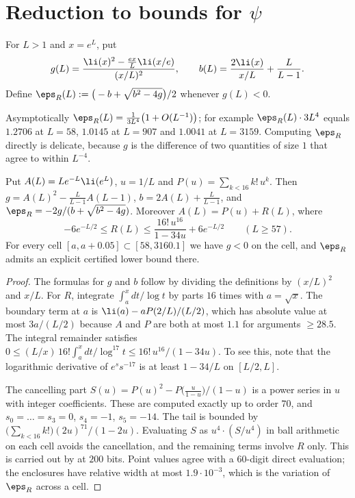 \section{Reduction to bounds for $\psi$}\label{sec:reduction}

\begin{definition}\label{def:epsR}
For $L > 1$ and $x = e^L$, put
\[
g(L) = \frac{\li(x)^2 - \frac{e x}{L}\li(x/e)}{(x/L)^2}, \qquad b(L) = \frac{2\li(x)}{x/L} + \frac{L}{L-1}.
\]
Define $\eps_R(L) := \big(-b + \sqrt{b^2 - 4g}\big)/2$ whenever $g(L) < 0$.
\end{definition}

Asymptotically $\eps_R(L) = \frac{1}{3L^4}\big(1+O(L^{-1})\big)$; for example $\eps_R(L)\cdot 3L^4$ equals $1.2706$ at $L = 58$, $1.0145$ at $L = 907$ and $1.0041$ at $L = 3159$.
Computing $\eps_R$ directly is delicate, because $g$ is the difference of two quantities of size $1$ that agree to within $L^{-4}$.

\begin{lemma}\label{lem:epsR}
Put $A(L) = L e^{-L}\li(e^L)$, $u = 1/L$ and $P(u) = \sum_{k<16} k!\,u^k$.
Then $g = A(L)^2 - \frac{L}{L-1}A(L-1)$, $b = 2A(L) + \frac{L}{L-1}$, and $\eps_R = -2g/(b + \sqrt{b^2-4g})$.
Moreover $A(L) = P(u) + R(L)$, where
\[
-6e^{-L/2} \le R(L) \le \frac{16!\,u^{16}}{1 - 34u} + 6e^{-L/2} \qquad (L \ge 57).
\]
For every cell $[a, a+0.05] \subset [58, 3160.1]$ we have $g < 0$ on the cell, and $\eps_R$ admits an explicit certified lower bound there.
\end{lemma}

\begin{proof}
The formulas for $g$ and $b$ follow by dividing the definitions by $(x/L)^2$ and $x/L$.
For $R$, integrate $\int_a^x dt/\log t$ by parts $16$ times with $a = \sqrt x$.
The boundary term at $a$ is $\li(a) - aP(2/L)/(L/2)$, which has absolute value at most $3a/(L/2)$ because $A$ and $P$ are both at most $1.1$ for arguments $\ge 28.5$.
The integral remainder satisfies $0 \le (L/x)\,16!\int_a^x dt/\log^{17}t \le 16!\,u^{16}/(1-34u)$.
To see this, note that the logarithmic derivative of $e^s s^{-17}$ is at least $1 - 34/L$ on $[L/2, L]$.

The cancelling part $S(u) = P(u)^2 - P\big(\tfrac{u}{1-u}\big)/(1-u)$ is a power series in $u$ with integer coefficients.
These are computed exactly up to order $70$, and $s_0 = \dots = s_3 = 0$, $s_4 = -1$, $s_5 = -14$.
The tail is bounded by $\big(\sum_{k<16}k!\big)(2u)^{71}/(1-2u)$.
Evaluating $S$ as $u^4\cdot(S/u^4)$ in ball arithmetic on each cell avoids the cancellation, and the remaining terms involve $R$ only.
This is carried out by  at $200$ bits.
Point values agree with a $60$-digit direct evaluation; the enclosures have relative width at most $1.9\cdot 10^{-3}$, which is the variation of $\eps_R$ across a cell.
\end{proof}

